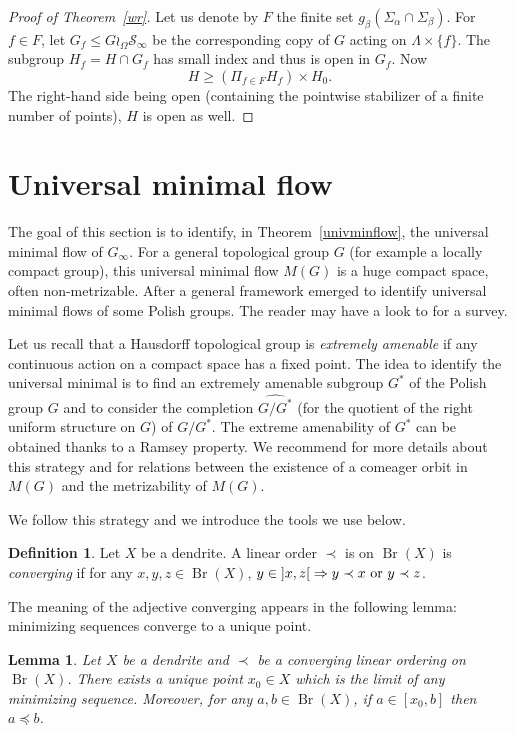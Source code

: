 \documentclass[JEP,XML,SOM,Unicode,NoFloatCountersInSection]{cedram}
\newcommand\implique{\mathchoice{\implies}{\Rightarrow}{\Rightarrow}{\Rightarrow}}
\let\mathcal\mathscr
\theoremstyle{plain}
\newtheorem{lem}[thm]{Lemma}
\theoremstyle{definition}
\newtheorem{defn}[thm]{Definition}
\newcommand{\cS}{\mathcal{S}}
\newcommand{\sinf}{\cS_\infty}
\DeclareMathOperator{\Br}{Br}
\begin{document}
\begin{proof}[Proof of Theorem~\ref{wr}]
Let us denote by $F$ the finite set $g_\beta(\Sigma_\alpha\cap\Sigma_\beta)$. For $f\in F$, let $G_f\leq G\wr_\Omega\sinf$ be the corresponding copy of $G$ acting on $\Lambda\times\{f\}$. The subgroup $H_f=H\cap G_f$ has small index and thus is open in $G_f$. Now
\[
H\geq\left(\Pi_{f\in F}H_f\right)\times H_0.
\]
The right-hand side being open (containing the pointwise stabilizer of a finite number of points), $H$ is open as well.
\end{proof}

\section{Universal minimal flow}\label{umf}

The goal of this section is to identify, in Theorem~\ref{univminflow}, the universal minimal flow of $G_\infty$. For a general topological group $G$ (for example a locally compact group), this universal minimal flow $M(G)$ is a huge compact space, often non-metrizable. After \cite{Pestov98,MR1937832,MR2140630} a general framework emerged to identify universal minimal flows of some Polish groups. The reader may have a look to \cite{MR2277969} for a survey.

Let us recall that a Hausdorff topological group is \emph{extremely amenable} if any continuous action on a compact space has a fixed point. The idea to identify the universal minimal is to find an extremely amenable subgroup $G^*$ of the Polish group $G$ and to consider the completion $\widehat{G/G^*}$ (for the quotient of the right uniform structure on $G$) of $G/G^*$. The extreme amenability of $G^*$ can be obtained thanks to a Ramsey property. We recommend \cite{melleray2015polish,MR3613453} for more details about this strategy and for relations between the existence of a comeager orbit in $M(G)$ and the metrizability of $M(G)$.

We follow this strategy and we introduce the tools we use below.

\begin{defn} Let $X$ be a dendrite. A linear order $\prec$ is on $\Br(X)$ is \emph{converging} if for any $x,y,z\in\Br(X)$, $y\in{}]x,z[{}\implique y\prec x\ \text{or}\ y\prec z$.
\end{defn}

The meaning of the adjective converging appears in the following lemma: minimizing sequences converge to a unique point.

\begin{lem}\label{min}Let $X$ be a dendrite and $\prec$ be a converging linear ordering on $\Br(X)$. There exists a unique point $x_0\in X$ which is the limit of any minimizing sequence. Moreover, for any $a,b\in \Br(X)$, if $a\in[x_0,b]$ then $a\preceq b$.
\end{lem}
\end{document}
